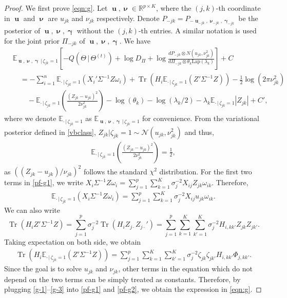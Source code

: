 \documentclass[pdftex]{imsart}
\DeclareMathOperator{\Tr}{Tr}
\DeclareMathOperator*{\bu}{\boldsymbol{u}}
\DeclareMathOperator*{\bnu}{\boldsymbol{\nu}}
\DeclareMathOperator*{\bgamma}{\boldsymbol{\gamma}}
\newcommand{\given}{\,|\,}
\theoremstyle{plain}
\begin{document}
\begin{proof}
We first prove \eqref{eqn:g}. 
Let $\bu, \bnu \in \mathbb{R}^{p \times K}$, where the $(j, k)$-th coordinate in $\bu$ and $\bnu$ are $u_{jk}$ and $\nu_{jk}$ respectively. 
Denote $P_{-jk} = P_{-\bu_{-jk}, \bnu_{-jk}, \bgamma_{-jk}}$ be the posterior of $\bu, \bnu, \bgamma$ without the $(j,k)$-th entries. A similar notation is used for the joint prior $\Pi_{-jk}$ of $\bu, \bnu, \bgamma$.
We have
\begin{align}
& \mathbb{E}_{\bu, \bnu, \bgamma \given \zeta_{jk} = 1}
\left[-Q(\Theta \given \Theta^{(t)}) + \log D_\Pi + 
\log \frac{
dP_{-jk} \otimes N(u_{jk}, \nu_{jk}^2)
}{
d\Pi_{-jk} \otimes \theta_k \text{Lap}(\lambda_k)
}\right] + C \nonumber \\
& \quad = - \sum_{i=1}^n \mathbb{E}_{\cdot \given \zeta_{jk}=1}(X_i'\Sigma^{-1} Z \omega_i) + 
\Tr(H_i \mathbb{E}_{\cdot \given \zeta_{jk}=1}(Z'\Sigma^{-1} Z))
- \frac{1}{2} \log (2\pi \nu_{jk}^2)
\label{pf-g1} \\
& \quad \quad 
- \mathbb{E}_{\cdot \given \zeta_{jk}=1}\left(
\frac{(Z_{jk} - u_{jk})^2}{2\nu_{jk}^2} 
\right)
- \log (\theta_k) - \log(\lambda_k/2) - \lambda_k \mathbb{E}_{\cdot \given \zeta_{jk}=1} |Z_{jk}| + C',
\label{pf-g2}
\end{align}
where we denote $\mathbb{E}_{\cdot \given \zeta_{jk}=1}$ as $\mathbb{E}_{\bu, \bnu, \bgamma \given \zeta_{jk} = 1}$ for convenience. 
From the variational posterior defined in \eqref{vbclass}, $Z_{jk}|\zeta_{jk} = 1 \sim \mathcal{N}(u_{jk},  \nu_{jk}^2)$ and thus,
\begin{align}
\label{g-1}
\mathbb{E}_{\cdot \given \zeta_{jk}=1}\left(
\frac{(Z_{jk} - u_{jk})^2}{2\nu_{jk}^2} \right) = \frac{1}{2},
\end{align}
as $((Z_{jk} - u_{jk})/\nu_{jk})^2$ follows the standard $\chi^2$ distribution.
For the first two terms in \eqref{pf-g1}, we write 
$X_i \Sigma^{-1} Z \omega_i = \sum_{j=1}^p \sum_{k=1}^K \sigma_j^{-2} X_{ij} Z_{jk} \omega_{ik}.$
Therefore,
\begin{align}
\label{g-2}
\mathbb{E}_{\cdot \given \zeta_{jk}=1}(X_i \Sigma^{-1} Z \omega_i) = \sum_{j=1}^p \sum_{k=1}^K \sigma_j^{-2} X_{ij} u_{jk} \omega_{ik}.
\end{align}
We can also write
$$\Tr(H_i Z' \Sigma^{-1} Z) = \sum_{j=1}^p \sigma_j^{-2} \Tr(H_i Z_{j\cdot} Z_{j\cdot}') 
= \sum_{j=1}^p \sum_{k=1}^K \sum_{k' = 1}^K \sigma_j^{-2} H_{i,kk'} Z_{jk}Z_{jk'}.$$
Taking expectation on both side, we obtain 
\begin{align}
\label{g-3}
\Tr(H_i \mathbb{E}_{\cdot \given \zeta_{jk}=1}(Z'\Sigma^{-1} Z)) = 
\sum_{j=1}^p \sum_{k=1}^K \sum_{k' = 1}^K \sigma_j^{-2} \zeta_{jk} \zeta_{jk'} H_{i,kk'} \Phi_{j, kk'}.
\end{align}
Since the goal is to solve $u_{jk}$ and $\nu_{jk}$, other terms in the equation which do not depend on the two terms can be simply treated as constants. Therefore, by plugging \eqref{g-1}--\eqref{g-3} into \eqref{pf-g1} and \eqref{pf-g2}, we obtain the expression in \eqref{eqn:g}.



\end{proof}
\end{document}
